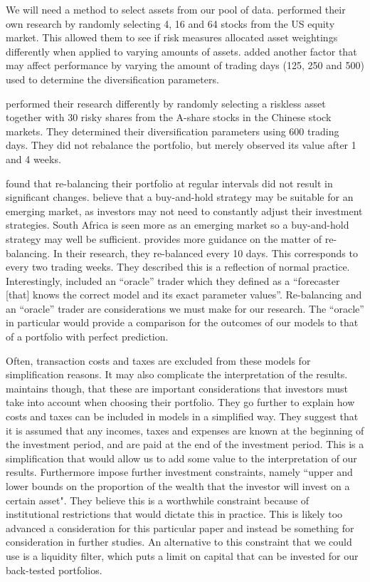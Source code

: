 \documentclass[12pt,a4paper]{article}
\begin{document}
We will need a method to select assets from our pool of data. \cite{righi2017simulation} performed their own research by randomly selecting 4, 16 and 64 stocks from the US equity market. This allowed them to see if risk measures allocated asset weightings differently when applied to varying amounts of assets. \cite{righi2017simulation} added another factor that may affect performance by varying the amount of trading days (125, 250 and 500) used to determine the diversification parameters. 

\cite{CHEN20111777} performed their research differently by randomly selecting a riskless asset together with 30 risky shares from the A-share stocks in the Chinese stock markets. They determined their diversification parameters using 600 trading days. They did not rebalance the portfolio, but merely observed its value after 1 and 4 weeks. 


\cite{righi2017simulation} found that re-balancing their portfolio at regular intervals did not result in significant changes. \cite{CHEN20111777} believe that a buy-and-hold strategy may be suitable for an emerging market, as investors may not need to constantly adjust their investment strategies. South Africa is seen more as an emerging market so a buy-and-hold strategy may well be sufficient. \citet*{KRATZ2018393} provides more guidance on the matter of re-balancing. In their research, they re-balanced every 10 days. This corresponds to every two trading weeks. They described this is a reflection of normal practice. Interestingly, \cite{KRATZ2018393} included an ``oracle'' trader which they defined as a ``forecaster [that] knows the correct model and its exact parameter values''.  Re-balancing and an ``oracle'' trader are considerations we must make for our research. The ``oracle'' in particular would provide a comparison for the outcomes of our models to that of a portfolio with perfect prediction.

Often, transaction costs and taxes are excluded from these models for simplification reasons. It may also complicate the interpretation of the results. \cite{CHEN20111777} maintains though, that these are important considerations that investors must take into account when choosing their portfolio. They go further to explain how costs and taxes can be included in models in a simplified way. They suggest that it is assumed that any incomes, taxes and expenses are known at the beginning of the investment period, and are paid at the end of the investment period. This is a simplification that would allow us to add some value to the interpretation of our results. Furthermore \cite{CHEN20111777} impose further investment constraints, namely ``upper and lower bounds on the proportion of the wealth that the investor will invest on a certain asset". They believe this is a worthwhile constraint because of institutional
restrictions that would dictate this in practice. This is likely too advanced a consideration for this particular paper and instead be something for consideration in further studies. An alternative to this constraint that we could use is a liquidity filter, which puts a limit on capital that can be invested for our back-tested portfolios.
\end{document}
